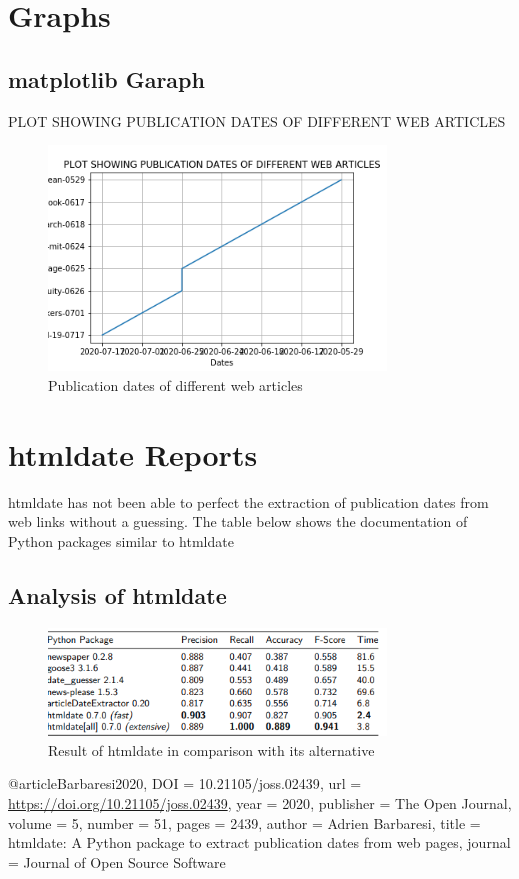 \documentclass[12pt, letterpaper, twoside]{report}
\begin{document}
\chapter{Graphs}
 

\section{matplotlib Garaph}
 PLOT SHOWING PUBLICATION DATES OF DIFFERENT WEB ARTICLES
\begin{figure}[ht]
    \centering
    \includegraphics[width=0.8\textwidth]{test.png}
    \caption{ Publication dates of different web articles}
    \label{fig:Trends}
\end{figure}

 \chapter{htmldate Reports}
%  
htmldate has not been able to perfect the extraction of publication dates from web links without a guessing.
The table below shows the documentation of Python packages similar to htmldate
\section{Analysis of htmldate }

\begin{figure}[ht]
    \centering
    \includegraphics[width=0.8\textwidth]{table.png}
    \caption{Result of htmldate in comparison with its alternative}
    \label{fig:Table}
\end{figure}
 
@article{Barbaresi2020,
  DOI = {10.21105/joss.02439},
  url = {\url{https://doi.org/10.21105/joss.02439}},
  year = {2020},
  publisher = {The Open Journal},
  volume = {5},
  number = {51},
  pages = {2439},
  author = {Adrien Barbaresi},
  title = {htmldate: A Python package to extract publication dates
from web pages},
  journal = {Journal of Open Source Software}
}

 
\end{document}
